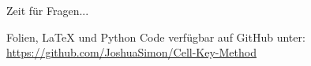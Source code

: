 \documentclass[aspectratio=169]{beamer}
\begin{document}

\begin{frame}
    \Huge{\centerline{Zeit für Fragen...}}
    \bigskip
    \bigskip
    \bigskip
    \bigskip

    \normalsize
    \centering
    Folien, \LaTeX \: und Python Code verfügbar auf GitHub  unter:
    \url{https://github.com/JoshuaSimon/Cell-Key-Method}
    \newline
    \newline
\end{frame}

\end{document}
